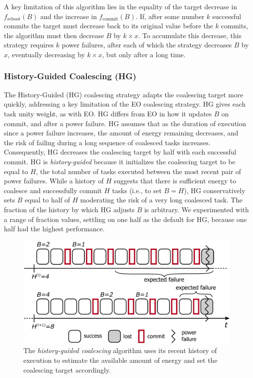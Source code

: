 A key limitation of this algorithm lies in the equality of the target decrease
in $f_\text{reboot}(B)$ and the increase in $f_\text{commit}(B)$.  If, after
some number $k$ successful commits the target must decrease back to its
original value before the $k$ commits, the algorithm must then decrease $B$ by
$k \times x$.  To accumulate this decrease, this strategy requires $k$ power
failures, after each of which the strategy decreases $B$ by $x$, eventually
decreasing by $k \times x$, but only after a long time. 

\subsubsection{History-Guided Coalescing (HG)}
\label{subsec:energyAware}

The History-Guided (HG) coalescing strategy adapts the coalescing target more
quickly, addressing a key limitation of the EO coalescing strategy.  
%
HG gives each task unity weight, as with EO.  
%
HG differs from EO in how it updates $B$ on commit, and after a power failure.
%
HG assumes that as the duration of execution since a power failure increases,
the amount of energy remaining decreases, and the risk of failing during a long
sequence of coalesced tasks increases.  
%
Consequently, HG decreases the coalescing target by half with each successful commit.
%
HG is {\em history-guided} because it initializes the coalescing target to be
equal to $H$, the total number of tasks executed between the most recent pair
of power failures.
%
While a history of $H$ suggests that there is sufficient energy to coalesce and
successfully commit $H$ tasks (i.e., to set $B = H$), HG conservatively sets $B$ equal to half
of $H$ moderating the risk of a very long coalesced task. 
%
The fraction of the history by which HG adjusts $B$ is arbitrary.
We experimented with a range of fraction values, settling on one half as the
default for HG, because one half had the highest performance. 

\begin{figure}
	\centering
	\includegraphics[width=0.5\columnwidth]{figures/energy-aware-coal.pdf}
	\caption{The {\em history-guided coalescing} algorithm uses its recent history of execution to estimate the available amount of energy and set the coalescing target accordingly.}
	\label{fig:energyAware}
\end{figure}


